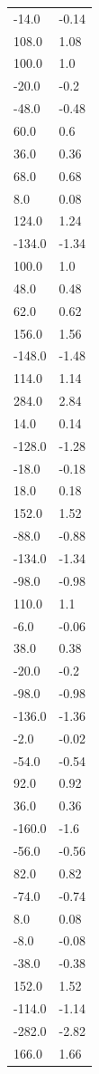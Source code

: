 \begin{longtable}{ll}
-14.0 & -0.14 \\
108.0 & 1.08 \\
100.0 & 1.0 \\
-20.0 & -0.2 \\
-48.0 & -0.48 \\
60.0 & 0.6 \\
36.0 & 0.36 \\
68.0 & 0.68 \\
8.0 & 0.08 \\
124.0 & 1.24 \\
-134.0 & -1.34 \\
100.0 & 1.0 \\
48.0 & 0.48 \\
62.0 & 0.62 \\
156.0 & 1.56 \\
-148.0 & -1.48 \\
114.0 & 1.14 \\
284.0 & 2.84 \\
14.0 & 0.14 \\
-128.0 & -1.28 \\
-18.0 & -0.18 \\
18.0 & 0.18 \\
152.0 & 1.52 \\
-88.0 & -0.88 \\
-134.0 & -1.34 \\
-98.0 & -0.98 \\
110.0 & 1.1 \\
-6.0 & -0.06 \\
38.0 & 0.38 \\
-20.0 & -0.2 \\
-98.0 & -0.98 \\
-136.0 & -1.36 \\
-2.0 & -0.02 \\
-54.0 & -0.54 \\
92.0 & 0.92 \\
36.0 & 0.36 \\
-160.0 & -1.6 \\
-56.0 & -0.56 \\
82.0 & 0.82 \\
-74.0 & -0.74 \\
8.0 & 0.08 \\
-8.0 & -0.08 \\
-38.0 & -0.38 \\
152.0 & 1.52 \\
-114.0 & -1.14 \\
-282.0 & -2.82 \\
166.0 & 1.66 \\

\end{longtable}
